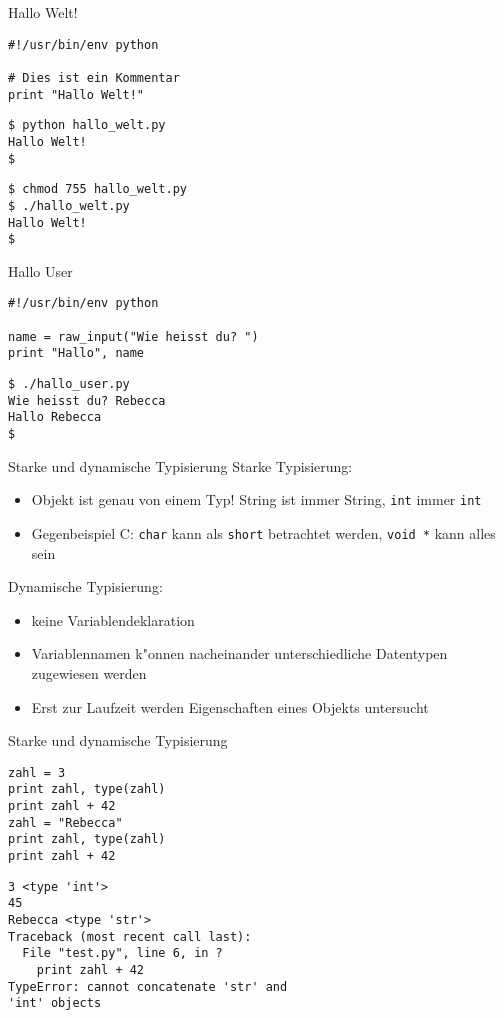 \begin{frame}[fragile]{Hallo Welt!}
\begin{lstlisting}[style=Python]
#!/usr/bin/env python

# Dies ist ein Kommentar
print "Hallo Welt!"
\end{lstlisting}
\begin{lstlisting}[style=Shell]
$ python hallo_welt.py
Hallo Welt!
$
\end{lstlisting}%
\begin{lstlisting}[style=Shell]
$ chmod 755 hallo_welt.py
$ ./hallo_welt.py
Hallo Welt!
$
\end{lstlisting} %
\end{frame}

\begin{frame}[fragile]{Hallo User}
\begin{lstlisting}[style=Python]
#!/usr/bin/env python

name = raw_input("Wie heisst du? ")
print "Hallo", name
\end{lstlisting}
\begin{lstlisting}[style=Shell]
$ ./hallo_user.py
Wie heisst du? Rebecca
Hallo Rebecca
$
\end{lstlisting}
\end{frame}

\begin{frame}{Starke und dynamische Typisierung}
\alert{Starke Typisierung:}
\begin{itemize}
\item Objekt ist genau von einem Typ! String ist immer String, \texttt{int} immer \texttt{int}
\item Gegenbeispiel C: \texttt{char} kann als \texttt{short} betrachtet werden, \texttt{void~*} kann alles sein
\end{itemize}
\alert{Dynamische Typisierung: }
\begin{itemize}
\item keine Variablendeklaration
\item Variablennamen k"onnen nacheinander unterschiedliche Datentypen zugewiesen werden
\item Erst zur Laufzeit werden Eigenschaften eines Objekts untersucht
\end{itemize}
\end{frame}

\begin{frame}[fragile]{Starke und dynamische Typisierung}
\begin{lstlisting}[style=Python]
zahl = 3
print zahl, type(zahl)
print zahl + 42
zahl = "Rebecca"
print zahl, type(zahl)
print zahl + 42
\end{lstlisting}
\begin{lstlisting}[style=Shell]
3 <type 'int'>
45
Rebecca <type 'str'>
Traceback (most recent call last):
  File "test.py", line 6, in ?
    print zahl + 42
TypeError: cannot concatenate 'str' and 
'int' objects
\end{lstlisting}
\end{frame}

